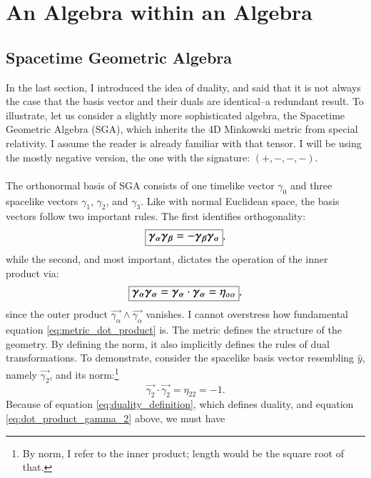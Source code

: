 
\section{An Algebra within an Algebra}

\subsection{Spacetime Geometric Algebra}
In the last section, I introduced the idea of duality, and said that it is not always the case that the basis vector and their duals are identical--a redundant result. To illustrate, let us consider a slightly more sophisticated algebra, the Spacetime Geometric Algebra (SGA), which inherits the 4D Minkowski metric from special relativity. I assume the reader is already familiar with that tensor. I will be using the mostly negative version, the one with the signature: $(+, -, -, -)$.
\\ \\ 
The orthonormal basis of SGA consists of one timelike vector $\gamma_0$ and three spacelike vectors $\gamma_1$, $\gamma_2$, and $\gamma_3$. Like with normal Euclidean space, the basis vectors follow two important rules. The first identifies orthogonality:
\begin{equation}
   \large\boxed{ \vec{\gamma_\alpha} \vec{\gamma_\beta} = -\vec{\gamma_\beta}\vec{\gamma_\alpha}},
\end{equation}
while the second, and most important, dictates the operation of the inner product via:
\begin{equation} \label{eq:metric_dot_product}
    \large\boxed{\vec{\gamma_\alpha}\vec{\gamma_\alpha} = \vec{\gamma_\alpha} \cdot \vec{\gamma_\alpha} = \large{ \eta_{\alpha\alpha}}},
\end{equation} 
since the outer product $\vec{\gamma_\alpha} \wedge \vec{\gamma_\alpha}$ vanishes. I cannot overstress how fundamental equation \eqref{eq:metric_dot_product} is. The metric defines the structure of the geometry. By defining the norm, it also implicitly defines the rules of dual transformations. To demonstrate, consider the spacelike basis vector resembling $\hat{y}$, namely $\vec{\gamma_2}$, and its norm:\footnote{By norm, I refer to the inner product; length would be the square root of that.}
\begin{equation} \label{eq:dot_product_gamma_2}
\vec{\gamma_2} \cdot \vec{\gamma_2} = \eta_{22} = -1.
\end{equation}
Because of equation \eqref{eq:duality_definition}, which defines duality, and equation \eqref{eq:dot_product_gamma_2} above, we must have
